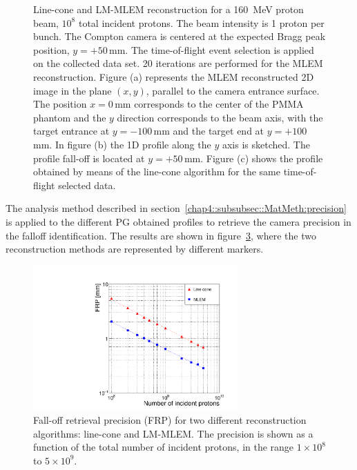 \begin{figure}
\begin{subfigure}[t]{.49\textwidth}
 \caption{}
 \label{}
\end{subfigure}
\caption{Line-cone and LM-MLEM reconstruction for a 160~MeV proton beam, $10^{8}$ total incident protons. The beam intensity is 1 proton per bunch. The Compton camera is centered at the expected Bragg peak position, $y=+50\,$mm. The time-of-flight event selection is applied on the collected data set. 20 iterations are performed for the MLEM reconstruction.
Figure (a) represents the MLEM reconstructed 2D image in the plane $(x,y)$, parallel to the camera entrance surface. The position $x=0\,$mm corresponds to the center of the PMMA phantom and the $y$ direction corresponds to the beam axis, with the target entrance at $y=-100\,$mm and the target end at $y=+100\,$mm.  In figure (b) the 1D profile along the $y$ axis is sketched. The profile fall-off is located at $y=+50\,$mm. Figure (c) shows the profile obtained by means of the line-cone algorithm for the same time-of-flight selected data.}
\label{chap4::fig::comparison}
\end{figure}


The analysis method described in section~\ref{chap4::subsubsec::MatMeth:precision} is applied to the different PG obtained profiles to retrieve the camera precision in the falloff identification. The results are shown in figure~\ref{chap4::fig::precision}, where the two reconstruction methods are represented by different markers.

\begin{figure}	
\centering
\includegraphics[width=0.7\textwidth]{03_GraphicFiles/chapter4_HTsimu/new/precisionVSprimaries.pdf}
\caption{Fall-off retrieval precision (FRP) for two different reconstruction algorithms: line-cone and LM-MLEM. The precision is shown as a function of the total number of incident protons, in the range $1\times10^{8}$ to $5\times10^{9}$.}	
\label{chap4::fig::precision}
\end{figure}

